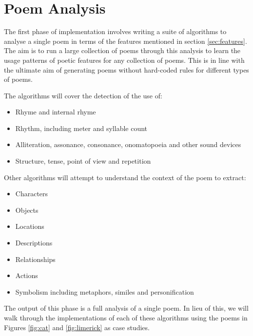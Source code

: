 \def\baselinestretch{1}
\chapter{Poem Analysis}
\ifpdf
    \graphicspath{{Theory/TheoryFigs/PNG/}{Theory/TheoryFigs/PDF/}{Theory/TheoryFigs/}}
\else
    \graphicspath{{Theory/TheoryFigs/EPS/}{Theory/TheoryFigs/}}
\fi

\def\baselinestretch{1.66}

The first phase of implementation involves writing a suite of algorithms to analyse a single poem in terms of the features mentioned in section \ref{sec:features}. The aim is to run a large collection of poems through this analysis to learn the usage patterns of poetic features for any collection of poems. This is in line with the ultimate aim of generating poems without hard-coded rules for different types of poems.

The algorithms will cover the detection of the use of:
\begin{itemize}
\setlength{\itemsep}{0pt}
\item{Rhyme and internal rhyme}
\item{Rhythm, including meter and syllable count}
\item{Alliteration, assonance, consonance, onomatopoeia and other sound devices}
\item{Structure, tense, point of view and repetition}
\end{itemize}

Other algorithms will attempt to understand the context of the poem to extract:
\begin{itemize}
\setlength{\itemsep}{0pt}
\item{Characters}
\item{Objects}
\item{Locations}
\item{Descriptions}
\item{Relationships}
\item{Actions}
\item{Symbolism including metaphors, similes and personification}
\end{itemize}

The output of this phase is a full analysis of a single poem. In lieu of this, we will walk through the implementations of each of these algorithms using the poems in Figures \ref{fig:cat} and \ref{fig:limerick} as case studies.


